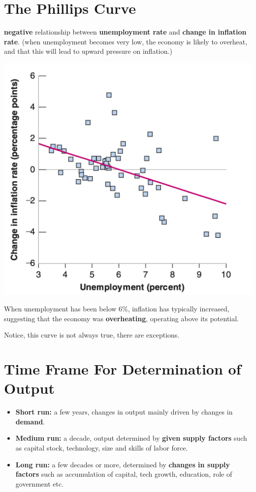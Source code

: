 \documentclass[11pt, a4paper]{ECON2123}
\begin{document}
\begin{spacing}{1.5}
    \section{The Phillips Curve}

    {\bf negative} relationship between {\bf unemployment rate}
    and {\bf change in inflation rate}. 
    (when unemployment becomes very low, the economy is likely 
    to overheat, and that this will lead to upward pressure 
    on inflation.)
    \begin{center}
        \includegraphics[scale=0.3]{images/0102-phillips-curve.png}
    \end{center}

    When unemployment has been below 6\%, inflation has 
    typically increased, suggesting that the economy was 
    {\bf overheating}, operating above its potential. 

    Notice, this curve is not always true, there are exceptions.

    \section{Time Frame For Determination of Output}
    \begin{itemize}
        \item {\bf Short run:} a few years, changes in output 
        mainly driven by changes in {\bf demand}.
        \item {\bf Medium run:} a decade, output determined 
        by {\bf given supply factors} such as capital stock, 
        technology, size and skills of labor force.
        \item {\bf Long run:} a few decades or more, 
        determined by {\bf changes in supply factors} such as 
        accumulation of capital, tech growth, education, 
        role of government etc.
    \end{itemize}



\end{spacing}
\end{document}
